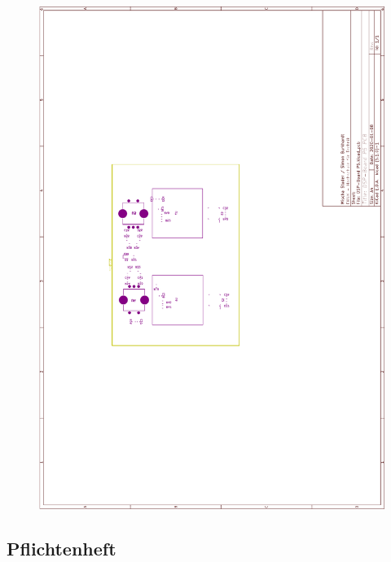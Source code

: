 \begin{appendix}
\begin{figure}[h]
	\centering
	\includegraphics[width=0.95\linewidth]{appendix/DSP-Board PCB V1-1 (4).pdf}
\end{figure}
\clearpage

\subsection{Pflichtenheft}
\label{app:Pflichtenheft}


\end{appendix}

